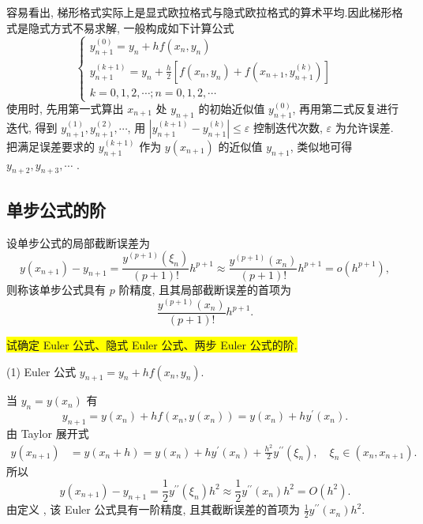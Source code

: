 容易看出, 梯形格式实际上是显式欧拉格式与隐式欧拉格式的算术平均.因此梯形格式是隐式方式不易求解, 一般构成如下计算公式
$$
\left\{\begin{array}{l}
y_{n+1}^{(0)}=y_{n}+h f\left(x_{n}, y_{n}\right) \\
y_{n+1}^{(k+1)}=y_{n}+\frac{h}{2}\left[f\left(x_{n}, y_{n}\right)+f\left(x_{n+1}, y_{n+1}^{(k)}\right)\right] \\
k=0,1,2, \cdots ; n=0,1,2, \cdots
\end{array}\right.
$$
使用时, 先用第一式算出 $ x_{n+1} $ 处 $ y_{n+1} $ 的初始近似值 $ y_{n+1}^{(0)} $, 再用第二式反复进行迭代, 得到 $ y_{n+1}^{(1)}, y_{n+1}^{(2)}, \cdots $, 用 $ \left|y_{n+1}^{(k+1)}-y_{n+1}^{(k)}\right| \leqslant \varepsilon $ 控制迭代次数, $ \varepsilon $ 为允许误差.把满足误差要求的 $ y_{n+1}^{(k+1)} $ 作为 $ y\left(x_{n+1}\right) $ 的近似值 $ y_{n+1} $, 类似地可得 $ y_{n+2}, y_{n+3}, \cdots $ .



\subsection{单步公式的阶}
设单步公式的局部截断误差为
$$
y\left(x_{n+1}\right)-y_{n+1}=\frac{y^{(p+1)}\left(\xi_{n}\right)}{(p+1)!} h^{p+1} \approx \frac{y^{(p+1)}\left(x_{n}\right)}{(p+1)!} h^{p+1}=o\left(h^{p+1}\right),
$$
则称该单步公式具有 $ p $ 阶精度, 且其局部截断误差的首项为
$$
\frac{y^{(p+1)}\left(x_{n}\right)}{(p+1)!} h^{p+1} .
$$

 \colorbox{yellow}{试确定 Euler 公式、隐式 Euler 公式、两步 Euler 公式的阶.}
 
 (1) Euler 公式 $y_{n+1}=y_{n}+h f\left(x_{n}, y_{n}\right) .$

当 $ y_{n}=y\left(x_{n}\right) $ 有
$$
y_{n+1}=y\left(x_{n}\right)+h f\left(x_{n}, y\left(x_{n}\right)\right)=y\left(x_{n}\right)+h y^{\prime}\left(x_{n}\right) .
$$
由 Taylor 展开式
$$
\begin{aligned}
y\left(x_{n+1}\right) & =y\left(x_{n}+h\right) =y\left(x_{n}\right)+h y^{\prime}\left(x_{n}\right)+\frac{h^{2}}{2} y^{\prime \prime}\left(\xi_{n}\right), \quad \xi_{n} \in\left(x_{n}, x_{n+1}\right) .
\end{aligned}
$$
所以
$$
y\left(x_{n+1}\right)-y_{n+1}=\frac{1}{2} y^{\prime \prime}\left(\xi_{n}\right) h^{2} \approx \frac{1}{2} y^{\prime \prime}\left(x_{n}\right) h^{2}=O\left(h^{2}\right) .
$$
由定义 , 该 Euler 公式具有一阶精度, 且其截断误差的首项为 $ \frac{1}{2} y^{\prime \prime}\left(x_{n}\right) h^{2} $.

